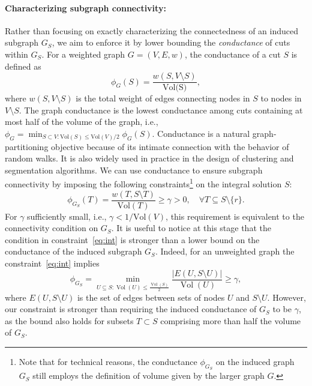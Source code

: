 \documentclass{article}
\DeclareMathOperator{\Vol}{Vol}
\begin{document}
\paragraph{Characterizing subgraph connectivity:}
Rather than focusing on exactly characterizing the connectedness of an induced subgraph $G_S$, we aim to enforce it by lower bounding the {\it conductance} of cuts within $G_S$.
For a weighted graph $G=(V,E,w)$, the conductance of a cut $S$ is defined as 
\[ \phi_G(S) = \frac{w(S,V \setminus S)}{\textrm{Vol(S)}}, \]
where $w(S, V \setminus S)$ is the total weight of edges connecting nodes in $S$ to nodes in $V \setminus S$. The graph conductance is the lowest conductance among cuts containing at most half of the volume of the graph, i.e., $\phi_G = \min_{S \subset V: \textrm{Vol}(S) \leq \textrm{Vol}(V)/2} \phi_G(S)$.
%
Conductance is a natural graph-partitioning objective because of its intimate connection with the behavior of random walks. It is also widely used in practice in the design of clustering and segmentation algorithms.
We can use conductance to ensure subgraph connectivity by imposing the following constraints\footnote{Note that for technical reasons, the conductance $\phi_{G_S}$ on the induced graph $G_S$ still employs the definition of volume given by the larger graph $G$.} on the integral solution $S$:
\begin{equation}\label{eq:int}
  \phi_{G_S}(T) = \frac{w(T, S \setminus T)}{\textrm{Vol}(T)} \geq \gamma > 0, \quad \forall T \subseteq S \setminus \{r\}.
\end{equation}
For $\gamma$ sufficiently small, i.e., $\gamma < 1/\textrm{Vol}(V)$, this requirement is equivalent to the connectivity condition on $G_S$. 
It is useful to notice at this stage that the condition in constraint~\eqref{eq:int} is stronger than a lower bound on the conductance of the induced subgraph $G_S$. Indeed, for an unweighted graph the constraint~\eqref{eq:int} implies
\[ \phi_{G_S} = \min_{U \subseteq S: \Vol(U)  \leq \frac{\Vol(S)}{2}} \frac{|E(U, S \setminus U)|}{\Vol(U)} \geq \gamma, \]
where $E(U, S \setminus U)$ is the set of edges between sets of nodes $U$ and $S \setminus U$.
However, our constraint is stronger than requiring the induced conductance of $G_S$ to be $\gamma$, as the bound also holds for subsets $T \subset S$ comprising more than half the volume of $G_S$. 
\end{document}
